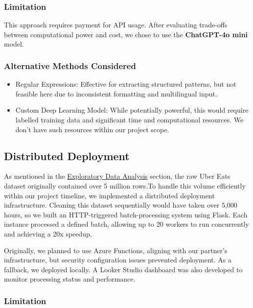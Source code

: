 \documentclass[
  11pt,
  a4paper,
  DIV=11,
  numbers=noendperiod]{scrartcl}
\providecommand{\tightlist}{%
  \setlength{\itemsep}{0pt}\setlength{\parskip}{0pt}}\usepackage{longtable,booktabs,array}
\begin{document}
\subsubsection{Limitation}\label{limitation}

This approach requires payment for API usage. After evaluating
trade-offs between computational power and cost, we chose to use the
\textbf{ChatGPT-4o mini} model.

\subsubsection{Alternative Methods
Considered}\label{alternative-methods-considered}

\begin{itemize}
\tightlist
\item
  Regular Expressions: Effective for extracting structured patterns, but
  not feasible here due to inconsistent formatting and multilingual
  input.
\item
  Custom Deep Learning Model: While potentially powerful, this would
  require labelled training data and significant time and computational
  resources. We don't have such resources within our project scope.
\end{itemize}

\subsection{Distributed Deployment}\label{distributed-deployment}

As mentioned in the \hyperref[exploratory-data-analysis]{Exploratory
Data Analysis} section, the raw Uber Eats dataset originally contained
over 5 million rows.To handle this volume efficiently within our project
timeline, we implemented a distributed deployment infrastructure.
Cleaning this dataset sequentially would have taken over 5,000 hours, so
we built an HTTP-triggered batch-processing system using Flask. Each
instance processed a defined batch, allowing up to 20 workers to run
concurrently and achieving a 20x speedup.

Originally, we planned to use Azure Functions, aligning with our
partner's infrastructure, but security configuration issues prevented
deployment. As a fallback, we deployed locally. A Looker Studio
dashboard was also developed to monitor processing status and
performance.

\subsubsection{Limitation}\label{limitation-1}
\end{document}
